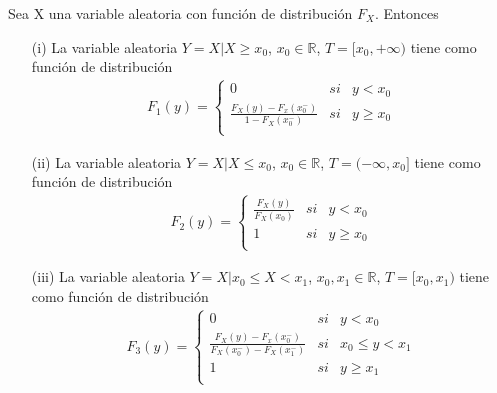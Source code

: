\begin{prop}
    Sea X una variable aleatoria con función de distribución $F_X$. Entonces
    \begin{enumerate}
        \item[(i)] La variable aleatoria $Y = X | X \ge x_0$, $x_0 \in \mathbb{R}$, $T = [x_0,+\infty)$ tiene como función de distribución
              \begin{align*}
                  F_1(y) = \left\{ \begin{array}{lcc}
                                       0                                          & si & y < x_0   \\
                                       \frac{F_X(y) - F_x(x_0^-)}{1 - F_X(x_0^-)} & si & y \ge x_0 \\
                                   \end{array}
                  \right.
              \end{align*}
        \item[(ii)] La variable aleatoria $Y = X | X \leq x_0$, $x_0 \in \mathbb{R}$, $T = (-\infty,x_0]$ tiene como función de distribución
              \begin{align*}
                  F_2(y) = \left\{ \begin{array}{lcc}
                                       \frac{F_X(y)}{F_X(x_0)} & si & y < x_0   \\
                                       1                       & si & y \ge x_0 \\
                                   \end{array}
                  \right.
              \end{align*}
        \item[(iii)] La variable aleatoria $Y = X | x_0 \leq X < x_1$, $x_0,x_1 \in \mathbb{R}$, $T = [x_0,x_1)$ tiene como función de distribución
              \begin{align*}
                  F_3(y) = \left\{ \begin{array}{lcc}
                                       0                                                   & si & y < x_0          \\
                                       \frac{F_X(y) - F_x(x_0^-)}{F_X(x_0^-) - F_X(x_1^-)} & si & x_0 \leq y < x_1 \\
                                       1                                                   & si & y \ge x_1        \\
                                   \end{array}
                  \right.
              \end{align*}
    \end{enumerate}
\end{prop}